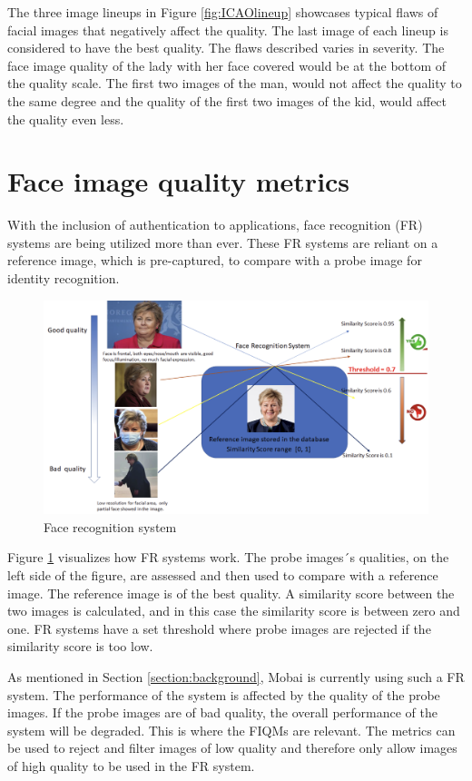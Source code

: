 %
The three image lineups in Figure \ref{fig:ICAOlineup} showcases typical flaws of facial images that negatively affect the quality. The last image of each lineup is considered to have the best quality. The flaws described varies in severity. The face image quality of the lady with her face covered would be at the bottom of the quality scale. The first two images of the man, would not affect the quality to the same degree and the quality of the first two images of the kid, would affect the quality even less. 
\newpage

\section{Face image quality metrics} 
With the inclusion of authentication to applications, face recognition (FR) systems are being utilized more than ever. These FR systems are reliant on a reference image, which is pre-captured, to compare with a probe image for identity recognition. 

\begin{figure}[h]
    \centering
    \includegraphics[scale = 0.45]{figures/Erna.png}
    \caption{Face recognition system}
    \label{fig:erna}
\end{figure}

Figure \ref{fig:erna} visualizes how FR systems work. The probe images´s qualities, on the left side of the figure, are assessed and then used to compare with a reference image. The reference image is of the best quality. A similarity score between the two images is calculated, and in this case the similarity score is between zero and one. FR systems have a set threshold where probe images are rejected if the similarity score is too low. 

As mentioned in Section \ref{section:background}, Mobai is currently using such a FR system. The performance of the system is affected by the quality of the probe images. If the probe images are of bad quality, the overall performance of the system will be degraded. This is where the FIQMs are relevant. The metrics can be used to reject and filter images of low quality and therefore only allow images of high quality to be used in the FR system. 
\newpage

